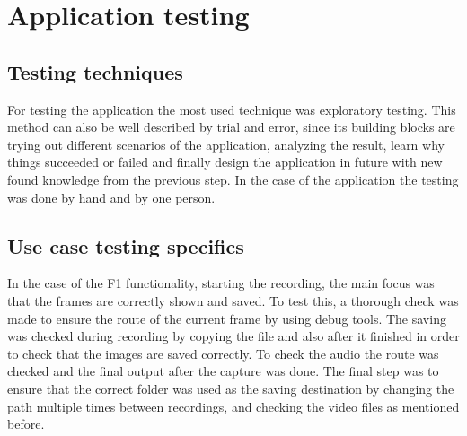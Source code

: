 \chapter{Application testing}
\label{chap:testing}

\section{Testing techniques}
\label{sec:testingsec1}

\par For testing the application the most used technique was exploratory testing. This method can also be well described by trial and error, since its building blocks are trying out different scenarios of the application, analyzing the result, learn why things succeeded or failed and finally design the application in future with new found knowledge from the previous step. In the case of the application the testing was done by hand and by one person.

\section{Use case testing specifics}
\label{sec:testingsec2}

\par In the case of the F1 functionality, starting the recording, the main focus was that the frames are correctly shown and saved. To test this, a thorough check was made to ensure the route of the current frame by using debug tools. The saving was checked during recording by copying the file and also after it finished in order to check that the images are saved correctly. To check the audio the route was checked and the final output after the capture was done. The final step was to ensure that the correct folder was used as the saving destination by changing the path multiple times between recordings, and checking the video files as mentioned before.